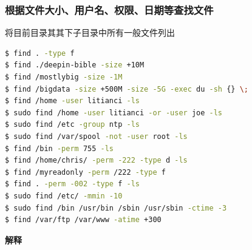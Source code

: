 \documentclass[doctor,openright,twoside]{sjtuthesis}
\theoremstyle{plain}
\theoremstyle{definition}
\theoremstyle{remark}
\theoremstyle{ocrenumbox}
\theoremstyle{plain}
\begin{document}
\subsubsection{根据文件大小、用户名、权限、日期等查找文件}

将目前目录其其下子目录中所有一般文件列出

\begin{lstlisting}[language=bash]
$ find . -type f
$ find ./deepin-bible -size +10M
$ find /mostlybig -size -1M
$ find /bigdata -size +500M -size -5G -exec du -sh {} \;
$ find /home -user litianci -ls
$ sudo find /home -user litianci -or -user joe -ls
$ sudo find /etc -group ntp -ls
$ sudo find /var/spool -not -user root -ls
$ find /bin -perm 755 -ls
$ find /home/chris/ -perm -222 -type d -ls
$ find /myreadonly -perm /222 -type f
$ find . -perm -002 -type f -ls
$ sudo find /etc/ -mmin -10
$ sudo find /bin /usr/bin /sbin /usr/sbin -ctime -3
$ find /var/ftp /var/www -atime +300
\end{lstlisting}

\textbf{解释}
\end{document}
